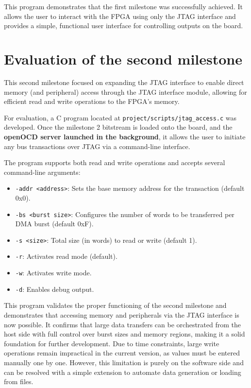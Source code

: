 \documentclass[a4paper,11pt,oneside]{report}
\begin{document}
This program demonstrates that the first milestone was successfully achieved.  
It allows the user to interact with the FPGA using only the JTAG interface and provides a simple, functional user interface for controlling outputs on the board.

\section{Evaluation of the second milestone}

This second milestone focused on expanding the JTAG interface to enable direct memory (and peripheral) access through the JTAG interface module, allowing for efficient read and write operations to the FPGA’s memory.

For evaluation, a C program located at \texttt{project/scripts/jtag\_access.c} was developed.
Once the milestone 2 bitstream is loaded onto the board, and the \textbf{openOCD server launched in the background}, it allows the user to initiate any bus transactions over JTAG via a command-line interface.

The program supports both read and write operations and accepts several command-line arguments:
\begin{itemize}
    \item \texttt{-addr <address>}: Sets the base memory address for the transaction (default 0x0).
    \item \texttt{-bs <burst size>}: Configures the number of words to be transferred per DMA burst (default 0xF).
    \item \texttt{-s <size>}: Total size (in words) to read or write (default 1).
    \item \texttt{-r}: Activates read mode (default).
    \item \texttt{-w}: Activates write mode.
    \item \texttt{-d}: Enables debug output.
\end{itemize}

This program validates the proper functioning of the second milestone and demonstrates that accessing memory and peripherals via the JTAG interface is now possible.
It confirms that large data transfers can be orchestrated from the host side with full control over burst sizes and memory regions, making it a solid foundation for further development.
Due to time constraints, large write operations remain impractical in the current version, as values must be entered manually one by one. 
However, this limitation is purely on the software side and can be resolved with a simple extension to automate data generation or loading from files.
\end{document}
